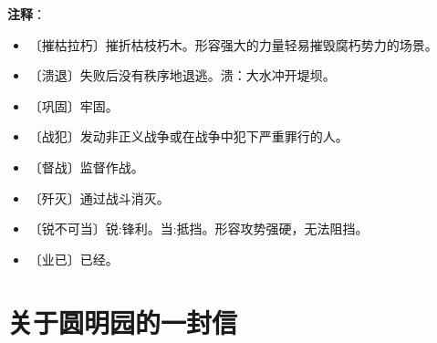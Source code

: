 \documentclass[12pt,UTF-8,openany]{ctexbook}
\begin{document}
\newpage

\textbf{注释}：

\vspace{-1em}

\begin{itemize}
    \setlength\itemsep{-0.2em}
    \item 〔摧枯拉朽〕摧折枯枝朽木。形容强大的力量轻易摧毁腐朽势力的场景。
    \item 〔溃退〕失败后没有秩序地退逃。溃：大水冲开堤坝。
    \item 〔巩固〕牢固。
    \item 〔战犯〕发动非正义战争或在战争中犯下严重罪行的人。
    \item 〔督战〕监督作战。
    \item 〔歼灭〕通过战斗消灭。
    \item 〔锐不可当〕锐:锋利。当:抵挡。形容攻势强硬，无法阻挡。
    \item 〔业已〕已经。
\end{itemize}

\chapter{关于圆明园的一封信}
\end{document}
